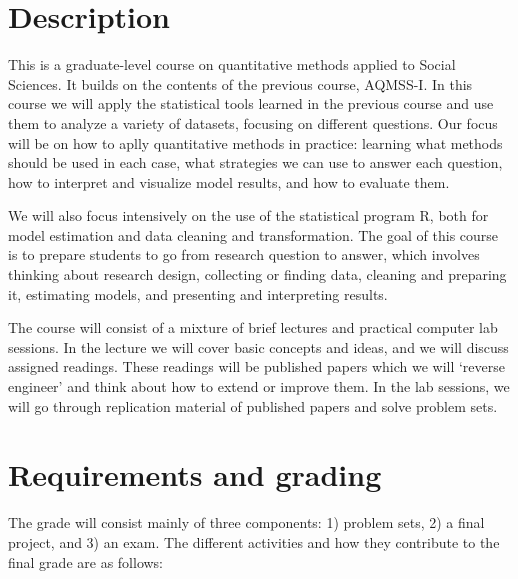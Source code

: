 \documentclass[12pt, a4paper]{article}
\begin{document}
\section{Description}

This is a graduate-level course on quantitative methods applied to Social Sciences. It builds on the contents of the previous course, AQMSS-I. In this course we will apply the statistical tools learned in the previous course and use them to analyze a variety of datasets, focusing on different questions. Our focus will be on how to aplly quantitative methods in practice: learning what methods should be used in each case, what strategies we can use to answer each question, how to interpret and visualize model results, and how to evaluate them.

We will also focus intensively on the use of the statistical program R, both for model estimation and data cleaning and transformation. The goal of this course is to prepare students to go from research question to answer, which involves thinking about research design, collecting or finding data, cleaning and preparing it, estimating models, and presenting and interpreting results.

The course will consist of a mixture of brief lectures and practical computer lab sessions. In the lecture we will cover basic concepts and ideas, and we will discuss assigned readings. These readings will be published papers which we will `reverse engineer' and think about how to extend or improve them. In the lab sessions, we will go through replication material of published papers and solve problem sets.

\newpage\section{Requirements and grading}

The grade will consist mainly of three components: 1) problem sets, 2) a final project, and 3) an exam. The different activities and how they contribute to the final grade are as follows:
\end{document}
